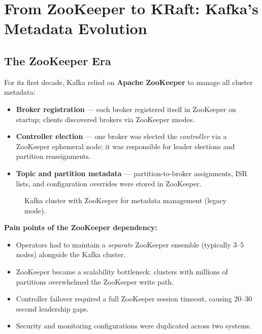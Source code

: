 \section{From ZooKeeper to KRaft: Kafka's Metadata Evolution~\cite{kafka_kraft}}


\subsection{The ZooKeeper Era}

For its first decade, Kafka relied on \textbf{Apache ZooKeeper} to manage all
cluster metadata:

\begin{itemize}
  \item \textbf{Broker registration} — each broker registered itself in ZooKeeper on startup; clients discovered brokers via ZooKeeper znodes.
  \item \textbf{Controller election} — one broker was elected the \emph{controller} via a ZooKeeper ephemeral node; it was responsible for leader elections and partition reassignments.
  \item \textbf{Topic and partition metadata} — partition-to-broker assignments, ISR lists, and configuration overrides were stored in ZooKeeper.
\end{itemize}

\begin{figure}[H]
  \centering
  \caption{Kafka cluster with ZooKeeper for metadata management (legacy mode).}
  \label{fig:kafka-zk}
\end{figure}

\textbf{Pain points of the ZooKeeper dependency:}
\begin{itemize}
  \item Operators had to maintain a \emph{separate} ZooKeeper ensemble (typically 3–5 nodes) alongside the Kafka cluster.
  \item ZooKeeper became a scalability bottleneck: clusters with millions of partitions overwhelmed the ZooKeeper write path.
  \item Controller failover required a full ZooKeeper session timeout, causing 20–30 second leadership gaps.
  \item Security and monitoring configurations were duplicated across two systems.
\end{itemize}

